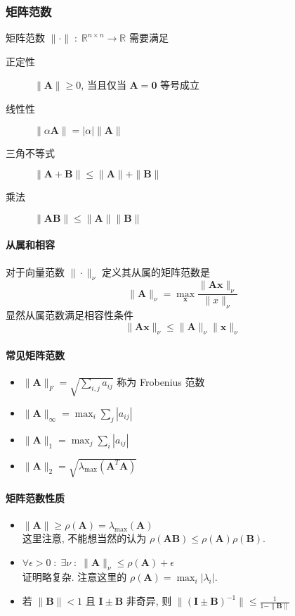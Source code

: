 \documentclass{ctexart}
\newcommand{\Rset}{\mathbb{R}}
\begin{document}
\subsubsection{矩阵范数}
    矩阵范数 $\|\cdot\|\;:\;\Rset^{n \times n}\to \Rset$ 需要满足
    \begin{description}
        \item[正定性] $\| \mathbf{A} \| \ge 0$, 当且仅当 $\mathbf{A} = \mathbf{0}$ 等号成立
        \item[线性性] $\|\alpha \mathbf{A}\| = |\alpha| \|\mathbf{A}\|$
        \item [三角不等式] $\|\mathbf{A} + \mathbf{B}\| \le \|\mathbf{A}\| + \|\mathbf{B}\|$
        \item[乘法] $\|\mathbf{A} \mathbf{B} \| \le \|\mathbf{A} \| \|\mathbf{B}\|$
    \end{description}
\paragraph{从属和相容}
    对于向量范数 $\|\cdot\|_{\nu}$ 定义其从属的矩阵范数是 \[
        \|\mathbf{A}\|_{\nu} = \max_{\mathbf{x}} \frac{\|\mathbf{A} \mathbf{x} \|_{\nu}}{\|x\|_{\nu}}
        \]
    显然从属范数满足相容性条件 \[
        \| \mathbf{A} \mathbf{x} \|_{\nu} \le \|\mathbf{A}\|_{\nu} \|\mathbf{x}\|_{\nu}\]
\paragraph{常见矩阵范数}
    \begin{itemize}
        \item $\|\mathbf{A}\|_F = \sqrt{\sum_{i,j} a_{ij}}$ 称为 Frobenius 范数
        \item $\|\mathbf{A}\|_{\infty} = \max_i \sum_j |a_{ij}|$
        \item $\|\mathbf{A}\|_1 = \max_j \sum_i |a_{ij}|$
        \item $\|\mathbf{A}\|_2 = \sqrt{\lambda_{\max}(\mathbf{A}^T \mathbf{A})}$
    \end{itemize}
\paragraph{矩阵范数性质}
    \begin{itemize}
        \item $\|\mathbf{A} \| \ge \rho(\mathbf{A} ) = \lambda_{\max}(\mathbf{A} )$\\
            这里注意, 不能想当然的认为 $\rho(\mathbf{A} \mathbf{B}) \le \rho(\mathbf{A}) \rho(\mathbf{B})$.
        \item $\forall \epsilon > 0\;:\;\exists \nu\;:\;\|\mathbf{A}\|_{\nu} \le \rho(\mathbf{A}) + \epsilon$\\
            证明略复杂. 注意这里的 $\rho(\mathbf{A}) = \max_i |\lambda_i|$.
        \item 若 $\|\mathbf{B} \| < 1$ 且 $\mathbf{I} \pm \mathbf{B} $ 非奇异, 则
            $ \| (\mathbf{I} \pm \mathbf{B})^{-1} \| \le \frac{1}{1 - \|\mathbf{B}\|}$
    \end{itemize}
\end{document}
